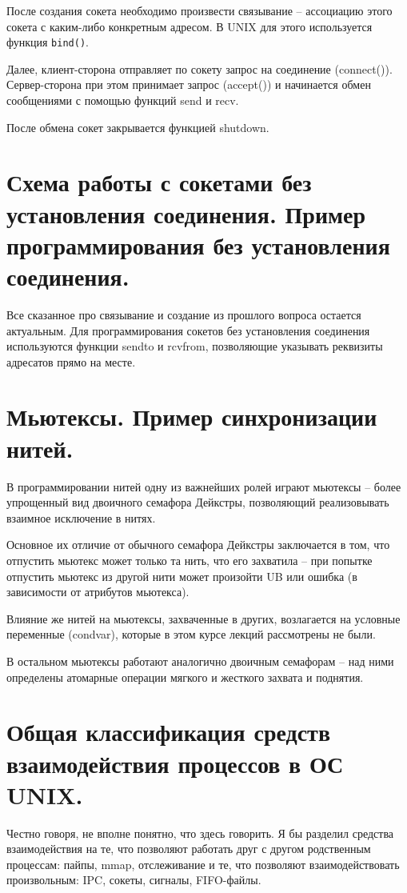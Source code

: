 \documentclass[a4paper,12pt,titlepage,finall]{article}
\begin{document}
После создания сокета необходимо произвести связывание -- ассоциацию этого сокета с каким-либо конкретным адресом. В UNIX для этого используется функция \texttt{bind()}.

Далее, клиент-сторона отправляет по сокету запрос на соединение (connect()). Сервер-сторона при этом принимает запрос (accept()) и начинается обмен сообщениями с помощью функций send и recv.

После обмена сокет закрывается функцией shutdown.

\section{Схема работы с сокетами без установления соединения.
Пример программирования без установления соединения.}

Все сказанное про связывание и создание из прошлого вопроса остается актуальным. Для программирования сокетов без установления соединения используются функции sendto и rcvfrom, позволяющие указывать реквизиты адресатов прямо на месте.

\section{Мьютексы. Пример синхронизации нитей.}

В программировании нитей одну из важнейших ролей играют мьютексы -- более упрощенный вид двоичного семафора Дейкстры, позволяющий реализовывать взаимное исключение в нитях.

Основное их отличие от обычного семафора Дейкстры заключается в том, что отпустить мьютекс может только та нить, что его захватила -- при попытке отпустить мьютекс из другой нити может произойти UB или ошибка (в зависимости от атрибутов мьютекса).

Влияние же нитей на мьютексы, захваченные в других, возлагается на условные переменные (condvar), которые в этом курсе лекций рассмотрены не были.

В остальном мьютексы работают аналогично двоичным семафорам -- над ними определены атомарные операции мягкого и жесткого захвата и поднятия.

\section{Общая классификация средств взаимодействия процессов в ОС UNIX.}
Честно говоря, не вполне понятно, что здесь говорить. Я бы разделил средства взаимодействия на те, что позволяют работать друг с другом родственным процессам: пайпы, mmap, отслеживание и те, что позволяют взаимодействовать произвольным: IPC, сокеты, сигналы, FIFO-файлы.
\end{document}
